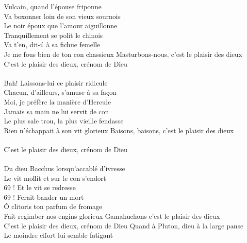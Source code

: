 %
 Vulcain, quand l'épouse friponne
\\Va boxonner loin de son vieux sournois
\\Le noir époux que l'amour aiguillonne
\\Tranquillement se polit le chinois
\\Va t'en, dit-il à sa fichue femelle
\\Je me fous bien de ton con chassieux
{Masturbons-nous, c'est le plaisir des dieux}
\\C'est le plaisir des dieux, crénom de Dieu
\\\\Bah! Laissons-lui ce plaisir ridicule
\\Chacun, d'ailleurs, s'amuse à sa façon
\\Moi, je préfère la manière d'Hercule
\\Jamais sa main ne lui servit de con
\\Le plus sale trou, la plus vieille fendasse
\\Rien n'échappait à son vit glorieux
{Baisons, baisons, c'est le plaisir des dieux  ~~~~~~~}
\\C'est le plaisir des dieux, crénom de Dieu
\\\\Du dieu Bacchus lorsqu'accablé d'ivresse
\\Le vit mollit et sur le con s'endort
\\69 ! Et le vit se redresse
\\69 ! Ferait bander un mort
\\Ô clitoris ton parfum de fromage
\\Fait regimber nos engins glorieux
{Gamahuchons c'est le plaisir des dieux  ~~~~~~~}
\\C'est le plaisir des dieux, crénom de Dieu
\breakpage
Quand à Pluton, dieu à la large panse
\\Le moindre effort lui semble fatigant
